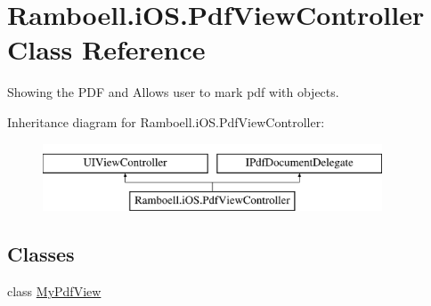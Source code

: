 \hypertarget{class_ramboell_1_1i_o_s_1_1_pdf_view_controller}{}\section{Ramboell.\+i\+O\+S.\+Pdf\+View\+Controller Class Reference}
\label{class_ramboell_1_1i_o_s_1_1_pdf_view_controller}


Showing the P\+DF and Allows user to mark pdf with objects.  


Inheritance diagram for Ramboell.\+i\+O\+S.\+Pdf\+View\+Controller\+:\begin{figure}[H]
\begin{center}
\leavevmode
\includegraphics[height=2.000000cm]{class_ramboell_1_1i_o_s_1_1_pdf_view_controller}
\end{center}
\end{figure}
\subsection*{Classes}
\begin{DoxyCompactItemize}
\item 
class \hyperlink{class_ramboell_1_1i_o_s_1_1_pdf_view_controller_1_1_my_pdf_view}{My\+Pdf\+View}
\end{DoxyCompactItemize}
